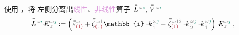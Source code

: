 使用 ，将  左侧分离出\textcolor{Plum}{线性}、\textcolor{Plum}{非线性}算子 $\Xint{\mathcolor{gray}{-}}{30}{\bar{\bar{L}}}^{\;\! \mathcolor{gray}{\omega} \textcolor{PineGreen}{\imath}}, \Xint{\mathcolor{gray}{-}}{21}{\bar{\bar{V}}}^{\;\! \mathcolor{gray}{\omega} \textcolor{PineGreen}{\imath}}$
\begin{subequations}
	\abovedisplayskip=-5pt
\begin{align}
	\Xint{\mathcolor{gray}{-}}{32}{\bar{\bar{L}}}^{\;\! \mathcolor{gray}{\omega} \textcolor{PineGreen}{\imath}} \Xint{\mathcolor{gray}{-}}{295}{\bar{E}}^{\;\!\mathcolor{gray}{\omega} \textcolor{PineGreen}{\jmath}}_{\;\! \mathcolor{gray}{z}} &:= \left( \bar{\bar{\varepsilon}}^{\;\! \mathcolor{gray}{\omega}}_{\textcolor{Maroon}{(1)}} + \bar{\bar{\zeta}}^{\;\! \mathcolor{gray}{\omega} \mathcolor{gray}{\check{1}}}_{\textcolor{Maroon}{(1)}} \mathbb{i} \Xint{\begin{smallmatrix} ~ \\ {}^{}_{\mathcolor{gray}{-}} \\ ~ \end{smallmatrix}}{15}{k}_{\;\! \mathcolor{gray}{\check{1}}}^{\;\! \mathcolor{gray}{\omega} \textcolor{PineGreen}{\jmath}} - \bar{\bar{\zeta}}^{\;\! \mathcolor{gray}{\omega} \mathcolor{gray}{\check{1} \check{2}}}_{\textcolor{Maroon}{(1)}} \Xint{\begin{smallmatrix} ~ \\ {}^{}_{\mathcolor{gray}{-}} \\ ~ \end{smallmatrix}}{15}{k}_{\;\! \mathcolor{gray}{\check{2}}}^{\;\! \mathcolor{gray}{\omega} \textcolor{PineGreen}{\jmath}} \Xint{\begin{smallmatrix} ~ \\ {}^{}_{\mathcolor{gray}{-}} \\ ~ \end{smallmatrix}}{15}{k}_{\;\! \mathcolor{gray}{\check{1}}}^{\;\! \mathcolor{gray}{\omega} \textcolor{PineGreen}{\jmath}} \right) \Xint{\mathcolor{gray}{-}}{295}{\bar{E}}^{\;\!\mathcolor{gray}{\omega} \textcolor{PineGreen}{\jmath}}_{\;\! \mathcolor{gray}{z}} ~, \label{eq:plane_wave_basis_eq-left_L} \\

\end{align}
\end{subequations}
